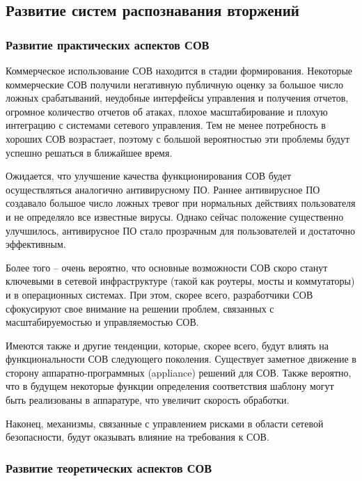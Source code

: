 \subsection{Развитие систем распознавания вторжений}

\subsubsection{Развитие практических аспектов СОВ}

Коммерческое использование СОВ находится в стадии формирования. Некоторые коммерческие
СОВ получили негативную публичную оценку за большое число ложных срабатываний, неудобные
интерфейсы управления и получения отчетов, огромное количество отчетов об атаках,
плохое масштабирование и плохую интеграцию с системами сетевого управления. Тем не менее
потребность в хороших СОВ возрастает, поэтому с большой вероятностью эти проблемы будут
успешно решаться в ближайшее время.

Ожидается, что улучшение качества функционирования СОВ будет осуществляться аналогично
антивирусному ПО. Раннее антивирусное ПО создавало большое число ложных тревог при
нормальных действиях пользователя и не определяло все известные вирусы. Однако сейчас
положение существенно улучшилось, антивирусное ПО стало прозрачным для пользователей
и достаточно эффективным.

Более того – очень вероятно, что основные возможности СОВ скоро станут ключевыми в
сетевой инфраструктуре (такой как роутеры, мосты и коммутаторы) и в операционных системах.
При этом, скорее всего, разработчики СОВ сфокусируют свое внимание на решении проблем,
связанных с масштабируемостью и управляемостью СОВ.

Имеются также и другие тенденции, которые, скорее всего, будут влиять на функциональности
СОВ следующего поколения. Существует заметное движение в сторону аппаратно-программных
(appliance) решений для СОВ. Также вероятно, что в будущем некоторые функции определения
соответствия шаблону могут быть реализованы в аппаратуре, что увеличит скорость обработки.

Наконец, механизмы, связанные с управлением рисками в области сетевой безопасности,
будут оказывать влияние на требования к СОВ.



\subsubsection{Развитие теоретических аспектов СОВ}

